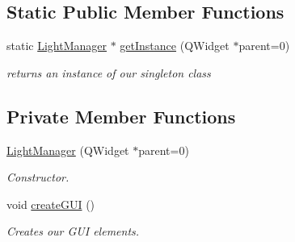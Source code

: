 \subsection*{Static Public Member Functions}
\begin{DoxyCompactItemize}
\item 
\hypertarget{class_light_manager_a340b84ff20d73b644cbdab2f77eba5e6}{static \hyperlink{class_light_manager}{Light\-Manager} $\ast$ \hyperlink{class_light_manager_a340b84ff20d73b644cbdab2f77eba5e6}{get\-Instance} (Q\-Widget $\ast$parent=0)}\label{class_light_manager_a340b84ff20d73b644cbdab2f77eba5e6}

\begin{DoxyCompactList}\small\item\em returns an instance of our singleton class \end{DoxyCompactList}\end{DoxyCompactItemize}
\subsection*{Private Member Functions}
\begin{DoxyCompactItemize}
\item 
\hypertarget{class_light_manager_af7566c95a70bbf2b8fb03f9565dd4f2e}{\hyperlink{class_light_manager_af7566c95a70bbf2b8fb03f9565dd4f2e}{Light\-Manager} (Q\-Widget $\ast$parent=0)}\label{class_light_manager_af7566c95a70bbf2b8fb03f9565dd4f2e}

\begin{DoxyCompactList}\small\item\em Constructor. \end{DoxyCompactList}\item 
\hypertarget{class_light_manager_af36184ad28565d27b80f213ef8ac04a1}{void \hyperlink{class_light_manager_af36184ad28565d27b80f213ef8ac04a1}{create\-G\-U\-I} ()}\label{class_light_manager_af36184ad28565d27b80f213ef8ac04a1}

\begin{DoxyCompactList}\small\item\em Creates our G\-U\-I elements. \end{DoxyCompactList}\end{DoxyCompactItemize}
